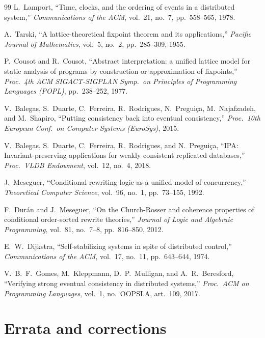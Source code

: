 \documentclass[11pt,a4paper]{article}
\theoremstyle{plain}
\theoremstyle{definition}
\theoremstyle{remark}
\renewcommand{\_}{\textunderscore\allowbreak}
\begin{document}
\begin{thebibliography}{99}
L.~Lamport,
``Time, clocks, and the ordering of events in a distributed system,''
\emph{Communications of the ACM}, vol.~21, no.~7, pp.~558--565, 1978.

A.~Tarski,
``A lattice-theoretical fixpoint theorem and its applications,''
\emph{Pacific Journal of Mathematics}, vol.~5, no.~2, pp.~285--309, 1955.

P.~Cousot and R.~Cousot,
``Abstract interpretation: a unified lattice model for static analysis of programs by construction or approximation of fixpoints,''
\emph{Proc.\ 4th ACM SIGACT-SIGPLAN Symp.\ on Principles of Programming Languages (POPL)}, pp.~238--252, 1977.

V.~Balegas, S.~Duarte, C.~Ferreira, R.~Rodrigues, N.~Pregui\c{c}a, M.~Najafzadeh, and M.~Shapiro,
``Putting consistency back into eventual consistency,''
\emph{Proc.\ 10th European Conf.\ on Computer Systems (EuroSys)}, 2015.

V.~Balegas, S.~Duarte, C.~Ferreira, R.~Rodrigues, and N.~Pregui\c{c}a,
``IPA: Invariant-preserving applications for weakly consistent replicated databases,''
\emph{Proc.\ VLDB Endowment}, vol.~12, no.~4, 2018.

J.~Meseguer,
``Conditional rewriting logic as a unified model of concurrency,''
\emph{Theoretical Computer Science}, vol.~96, no.~1, pp.~73--155, 1992.

F.~Dur\'an and J.~Meseguer,
``On the Church-Rosser and coherence properties of conditional order-sorted rewrite theories,''
\emph{Journal of Logic and Algebraic Programming}, vol.~81, no.~7--8, pp.~816--850, 2012.

E.~W.~Dijkstra,
``Self-stabilizing systems in spite of distributed control,''
\emph{Communications of the ACM}, vol.~17, no.~11, pp.~643--644, 1974.

V.~B.~F.~Gomes, M.~Kleppmann, D.~P.~Mulligan, and A.~R.~Beresford,
``Verifying strong eventual consistency in distributed systems,''
\emph{Proc.\ ACM on Programming Languages}, vol.~1, no.~OOPSLA, art.~109, 2017.

\end{thebibliography}

\appendix
\section{Errata and corrections}
\label{app:errata}
\end{document}
